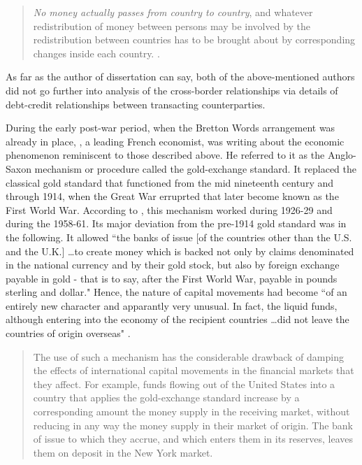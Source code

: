 \begin{quote}
\textit{No money actually passes from country to country}, and whatever redistribution of money between persons may be involved by the redistribution between countries has to be brought about by corresponding changes inside each country. \citep[pp.~17-18, emphasis added]{hayek1937}.
\end{quote}

As far as the author of dissertation can say, both of the above-mentioned authors did not go further into analysis of the cross-border relationships via details of debt-credit relationships between transacting counterparties. 

During the early post-war period, when the Bretton Words arrangement was already in place, \citeauthor{rueff1972}, a leading French economist, was writing about the economic phenomenon reminiscent to those described above. He referred to it as the Anglo-Saxon mechanism or procedure called the gold-exchange standard.  It replaced the classical gold standard that functioned from the mid nineteenth century and through 1914, when the Great War erruprted that later become known as the First World War. According to \citeauthor{rueff1972}, this mechanism worked during 1926-29 and during the 1958-61. Its major deviation from the pre-1914 gold standard was in the following. It allowed ``the banks of issue [of the countries other than the U.S. and the U.K.] \dots to create money which is backed not only by claims denominated in the national currency and by their gold stock, but also by foreign exchange payable in gold - that is to say, after the First World War, payable in pounds sterling and dollar." Hence, the nature of capital movements had become ``of an entirely new character and apparantly very unusual. In fact, the liquid funds, although entering into the economy of the recipient countries \dots did not leave the countries of origin overseas" \cite[p.~21-22]{rueff1972}.   

\begin{quote}
The use of such a mechanism has the considerable drawback of damping the effects of international capital movements in the financial markets that they affect. For example, funds flowing out of the United States into a country that applies the gold-exchange standard increase by a corresponding amount the money supply in the receiving market, without reducing in any way the money supply in their market of origin. The bank of issue to which they accrue, and which enters them in its reserves, leaves them on deposit in the New York market. \citep[p.~17]{rueff1972}
\end{quote}

